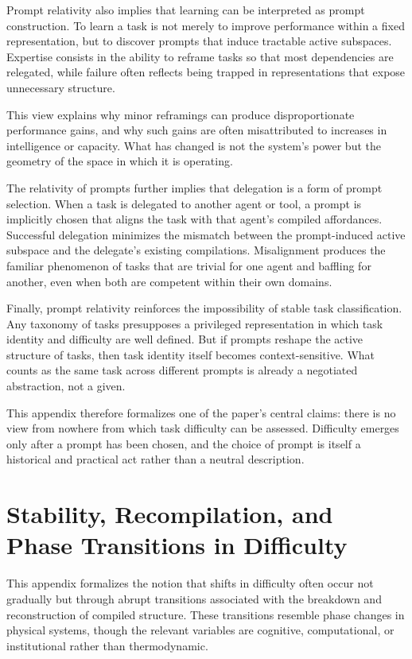 \documentclass[12pt]{article}
\begin{document}
Prompt relativity also implies that learning can be interpreted as prompt construction. To learn a task is not merely to improve performance within a fixed representation, but to discover prompts that induce tractable active subspaces. Expertise consists in the ability to reframe tasks so that most dependencies are relegated, while failure often reflects being trapped in representations that expose unnecessary structure.

This view explains why minor reframings can produce disproportionate performance gains, and why such gains are often misattributed to increases in intelligence or capacity. What has changed is not the system’s power but the geometry of the space in which it is operating.

The relativity of prompts further implies that delegation is a form of prompt selection. When a task is delegated to another agent or tool, a prompt is implicitly chosen that aligns the task with that agent’s compiled affordances. Successful delegation minimizes the mismatch between the prompt-induced active subspace and the delegate’s existing compilations. Misalignment produces the familiar phenomenon of tasks that are trivial for one agent and baffling for another, even when both are competent within their own domains.

Finally, prompt relativity reinforces the impossibility of stable task classification. Any taxonomy of tasks presupposes a privileged representation in which task identity and difficulty are well defined. But if prompts reshape the active structure of tasks, then task identity itself becomes context-sensitive. What counts as the same task across different prompts is already a negotiated abstraction, not a given.

This appendix therefore formalizes one of the paper’s central claims: there is no view from nowhere from which task difficulty can be assessed. Difficulty emerges only after a prompt has been chosen, and the choice of prompt is itself a historical and practical act rather than a neutral description.

\section{Stability, Recompilation, and Phase Transitions in Difficulty}

This appendix formalizes the notion that shifts in difficulty often occur not gradually but through abrupt transitions associated with the breakdown and reconstruction of compiled structure. These transitions resemble phase changes in physical systems, though the relevant variables are cognitive, computational, or institutional rather than thermodynamic.
\end{document}
